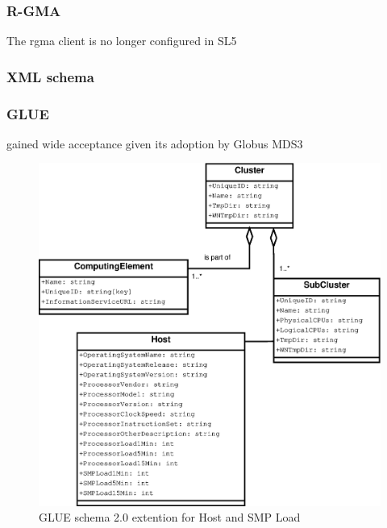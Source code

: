 \subsubsection{R-GMA}
The rgma client is no longer configured in SL5


\newpage
\subsubsection{XML schema}
\subsubsection{GLUE}
gained wide acceptance given its adoption by Globus MDS3
\newpage

\begin{figure}[htb]
\centering
 \includegraphics[width=5in]{images/gluece_ext.eps}
\caption{GLUE schema 2.0 extention for Host and SMP Load}
\label{figure:gluece_ext}
\end{figure}

\newpage

